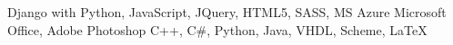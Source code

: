 \begin{cvskills}
	 {Django with Python, JavaScript, JQuery, HTML5, SASS, MS Azure}
	 {Microsoft Office, Adobe Photoshop}
	 {C++, C\#, Python, Java, VHDL, Scheme, LaTeX}
  \end{cvskills}

